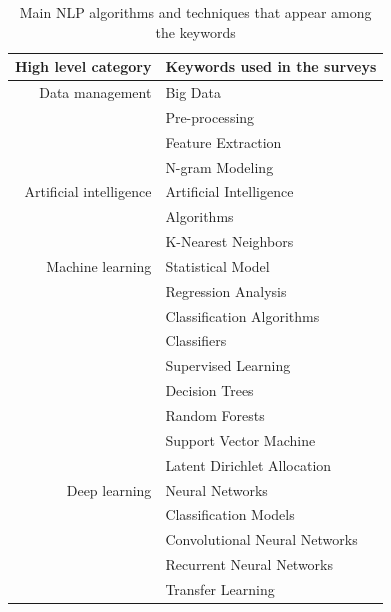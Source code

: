 \begin{table}[bp]
    \centering
    \caption{Main NLP algorithms and techniques that appear among the keywords}
    \begin{tabular}{rl}
        High level category     & Keywords used in the surveys  \\
        \toprule
        Data management         & Big Data                      \\
                                & Pre-processing                \\
                                & Feature Extraction            \\
                                & N-gram Modeling               \\
        Artificial intelligence & Artificial Intelligence       \\
                                & Algorithms                    \\
                                & K-Nearest Neighbors           \\
        Machine learning        & Statistical Model             \\
                                & Regression Analysis           \\
                                & Classification Algorithms     \\
                                & Classifiers                   \\
                                & Supervised Learning           \\
                                & Decision Trees                \\
                                & Random Forests                \\
                                & Support Vector Machine        \\
                                & Latent Dirichlet Allocation   \\
        Deep learning           & Neural Networks               \\
                                & Classification Models         \\
                                & Convolutional Neural Networks \\
                                & Recurrent Neural Networks     \\
                                & Transfer Learning             \\
        \bottomrule
    \end{tabular}
    \label{table:nlp-tools}
\end{table}

